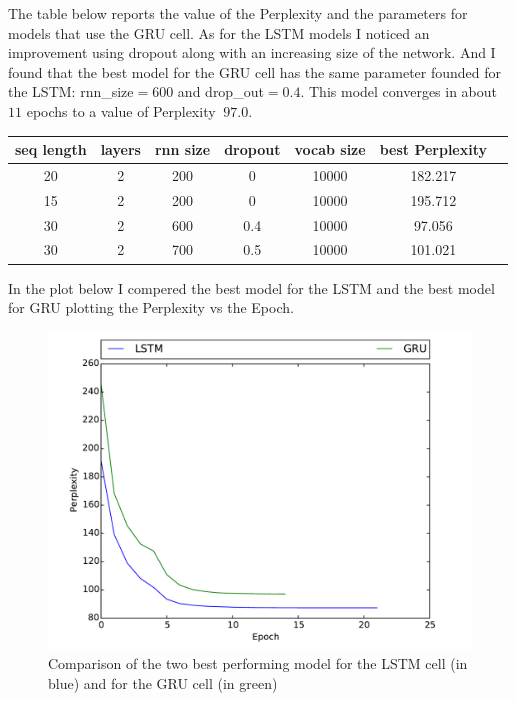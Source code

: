 \documentclass{article}
\begin{document}
\begin{enumerate}
The table below reports the value of the Perplexity and the parameters for models that use the GRU cell. As for the LSTM models I noticed an improvement using dropout along with an increasing size of the network. And I found that the best model for the GRU cell has the same parameter founded for the LSTM: rnn\_size$=600$ and  drop\_out$=0.4$. This model converges in about $11$ epochs to a value of Perplexity $~97.0$.


\begin{center}
\begin{tabular}{ |c|c|c|c|c|c|c|} 
\hline
seq length & layers & rnn size & dropout & vocab size & best Perplexity\\
\hline
 20 & 2 & 200 & 0 &  10000 & 182.217\\ 
 15 & 2 & 200 & 0 &  10000 & 195.712\\ 
 30 & 2 & 600 & 0.4 &  10000 & 97.056\\
 30 & 2 & 700 & 0.5 & 10000 & 101.021\\  
\hline
\end{tabular}
\end{center}
In the plot below I compered the best model for the LSTM and the best model for GRU plotting the Perplexity vs the Epoch. 





\begin{figure}[ht!]
  \centering
  \includegraphics[width=1\textwidth]{LSTMvsGRU2.pdf}
  \caption{Comparison of the two best performing model for the LSTM cell (in blue) and for the GRU cell (in green)}
\end{figure}





\end{enumerate}
\end{document}
